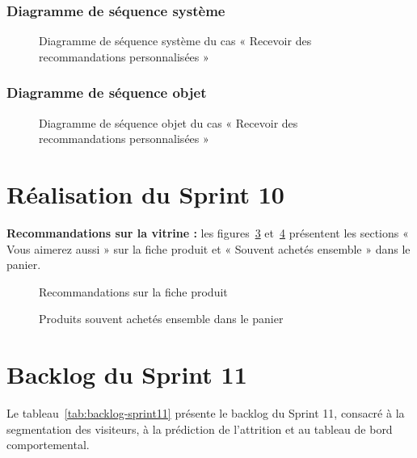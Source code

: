\clearpage

\subsubsection{Diagramme de séquence système}
\begin{figure}[H]
    \centering
    \caption{Diagramme de séquence système du cas « Recevoir des recommandations personnalisées »}
    \label{fig:dss-reco}
\end{figure}

\subsubsection{Diagramme de séquence objet}
\begin{figure}[H]
    \centering
    \caption{Diagramme de séquence objet du cas « Recevoir des recommandations personnalisées »}
    \label{fig:dso-reco}
\end{figure}
\clearpage
\section{Réalisation du Sprint 10}
\textbf{Recommandations sur la vitrine :} les figures~\ref{fig:ui-reco-fiche} et~\ref{fig:ui-reco-panier} présentent les sections « Vous aimerez aussi » sur la fiche produit et « Souvent achetés ensemble » dans le panier.
\begin{figure}[H]
    \centering
    \caption{Recommandations sur la fiche produit}
    \label{fig:ui-reco-fiche}
\end{figure}
\begin{figure}[H]
    \centering
    \caption{Produits souvent achetés ensemble dans le panier}
    \label{fig:ui-reco-panier}
\end{figure}
\clearpage


\section{Backlog du Sprint 11}

Le tableau~\ref{tab:backlog-sprint11} présente le backlog du Sprint 11, consacré à la segmentation des visiteurs, à la prédiction de l'attrition et au tableau de bord comportemental.

